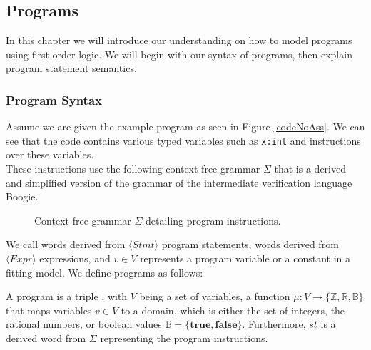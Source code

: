 \subsection{Programs}
In this chapter we will introduce our understanding on how to model programs using first-order logic. We will begin with our syntax of programs, then explain program statement semantics.

\subsubsection{Program Syntax}
Assume we are given the example program as seen in Figure \ref{codeNoAss}. We can see that the code contains various typed variables such as \texttt{x:int} and instructions over these variables. \\ These instructions use the following context-free grammar $\Sigma$ that is a derived and simplified version of the grammar of the intermediate verification language Boogie\cite{Boogie}.
\setlength{\grammarparsep}{20pt plus 1pt minus 1pt} %
\setlength{\grammarindent}{12em} %
\begin{figure}[H]
	
	\caption{Context-free grammar $\Sigma$ detailing program instructions.}
	\label{grmr}
\end{figure}
We call words derived from $\langle Stmt \rangle$ program statements, words derived from $\langle Expr \rangle$ expressions, and $v \in V$ represents a program variable or a constant in a fitting model.
We define programs as follows:

\begin{mydef}[Programs]
	A program is a triple \prg, with $V$ being a set of variables, a function $\mu: V \rightarrow \{ \mathbb{Z}, \mathbb{R}, \mathbb{B} \}$ that maps variables $v \in V$ to a domain, which is either the set of integers, the rational numbers, or boolean values $\mathbb{B} = \{\textbf{true}, \textbf{false}\}$. Furthermore, $st$ is a derived word from $\Sigma$ representing the program instructions.
\end{mydef}
